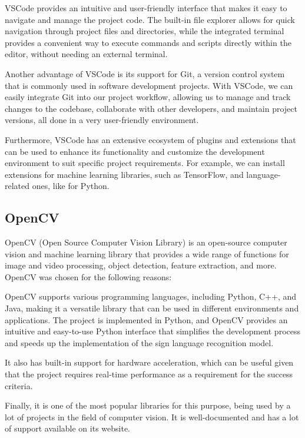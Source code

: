 \documentclass[final,rdr32.tex]{subfiles}
\begin{document}
VSCode provides an intuitive and user-friendly interface that makes it easy to navigate and manage the project code. The built-in file explorer allows for quick navigation through project files and directories, while the integrated terminal provides a convenient way to execute commands and scripts directly within the editor, without needing an external terminal.

Another advantage of VSCode is its support for Git, a version control system that is commonly used in software development projects. With VSCode, we can easily integrate Git into our project workflow, allowing us to manage and track changes to the codebase, collaborate with other developers, and maintain project versions, all done in a very user-friendly environment.

Furthermore, VSCode has an extensive ecosystem of plugins and extensions that can be used to enhance its functionality and customize the development environment to suit specific project requirements. For example, we can install extensions for machine learning libraries, such as TensorFlow, and language-related ones, like for Python.

\subsection{OpenCV}

OpenCV (Open Source Computer Vision Library) is an open-source computer vision and machine learning library that provides a wide range of functions for image and video processing, object detection, feature extraction, and more. OpenCV was chosen for the following reasons:

OpenCV supports various programming languages, including Python, C++, and Java, making it a versatile library that can be used in different environments and applications. The project is implemented in Python, and OpenCV provides an intuitive and easy-to-use Python interface that simplifies the development process and speeds up the implementation of the sign language recognition model.

It also has built-in support for hardware acceleration, which can be useful given that the project requires real-time performance as a requirement for the success criteria.

Finally, it is one of the most popular libraries for this purpose, being used by a lot of projects in the field of computer vision. It is well-documented and has a lot of support available on its website.
\end{document}

